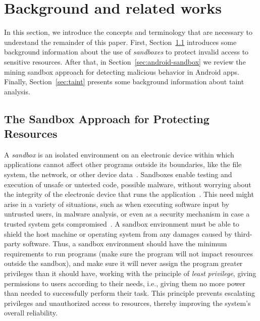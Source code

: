 \section{Background and related works}


In this section, we introduce the concepts and terminology that are necessary to understand the remainder of this paper. First, Section~\ref{sec:sandbox} introduces some background information about the use of \emph{sandboxes} to protect invalid access to sensitive resources. After that, in Section~\ref{sec:android-sandbox} we review the mining sandbox approach for detecting malicious behavior in Android apps. Finally, Section~\ref{sec:taint} presents some background information about taint analysis.

\subsection{The Sandbox Approach for Protecting Resources}\label{sec:sandbox}

A \emph{sandbox} is an isolated environment on an electronic device within which applications cannot affect other programs outside its boundaries, like the file system, the network, or other device data~\cite{DBLP:journals/peerj-cs/MaassSCS16}. Sandboxes enable testing and execution of unsafe or untested code, possible malware, without worrying about the integrity of the electronic device that runs the application~\cite{DBLP:conf/esorics/BordoniCS17}. This need might arise in a variety of situations, such as when executing software input by untrusted users, in malware analysis, or even as a security mechanism in case a trusted system gets compromised~\cite{DBLP:journals/peerj-cs/MaassSCS16}.
A sandbox environment must be able to shield the host machine or operating system from any damages caused by third-party software. Thus, a sandbox environment should have the minimum requirements to run programs (make sure the program will not impact resources outside the sandbox), and make sure it will never assign the program greater privileges than it should have, working with the principle of \emph{least privilege}, giving permissions to users according to their needs, i.e., giving them no more power than needed to successfully perform their task. This principle prevents escalating privileges and unauthorized access to resources, thereby improving the system's overall reliability.

